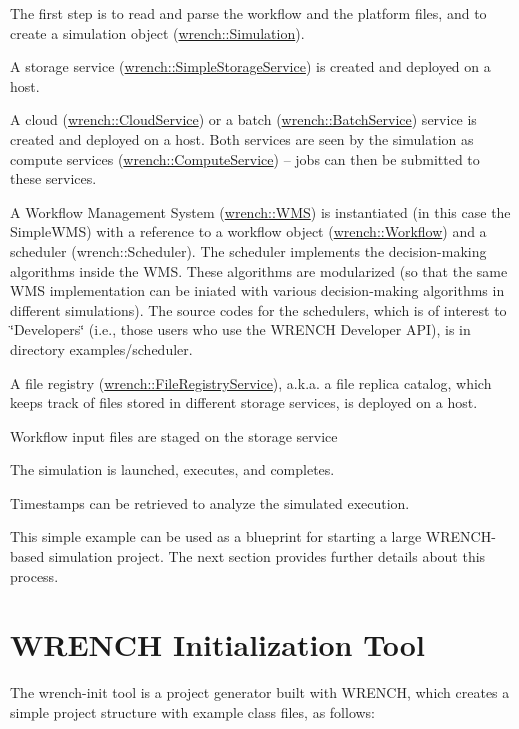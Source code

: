 \begin{DoxyItemize}
\item The first step is to read and parse the workflow and the platform files, and to create a simulation object ({\ttfamily \hyperlink{classwrench_1_1_simulation}{wrench\+::\+Simulation}}).
\item A storage service ({\ttfamily \hyperlink{classwrench_1_1_simple_storage_service}{wrench\+::\+Simple\+Storage\+Service}}) is created and deployed on a host.
\item A cloud ({\ttfamily \hyperlink{classwrench_1_1_cloud_service}{wrench\+::\+Cloud\+Service}}) or a batch ({\ttfamily \hyperlink{classwrench_1_1_batch_service}{wrench\+::\+Batch\+Service}}) service is created and deployed on a host. Both services are seen by the simulation as compute services ({\ttfamily \hyperlink{classwrench_1_1_compute_service}{wrench\+::\+Compute\+Service}}) – jobs can then be submitted to these services.
\item A Workflow Management System ({\ttfamily \hyperlink{classwrench_1_1_w_m_s}{wrench\+::\+W\+MS}}) is instantiated (in this case the {\ttfamily Simple\+W\+MS}) with a reference to a workflow object ({\ttfamily \hyperlink{classwrench_1_1_workflow}{wrench\+::\+Workflow}}) and a scheduler ({\ttfamily wrench\+::\+Scheduler}). The scheduler implements the decision-\/making algorithms inside the W\+MS. These algorithms are modularized (so that the same W\+MS implementation can be iniated with various decision-\/making algorithms in different simulations). The source codes for the schedulers, which is of interest to \char`\"{}\+Developers\char`\"{} (i.\+e., those users who use the W\+R\+E\+N\+CH Developer A\+PI), is in directory {\ttfamily examples/scheduler}.
\item A file registry ({\ttfamily \hyperlink{classwrench_1_1_file_registry_service}{wrench\+::\+File\+Registry\+Service}}), a.\+k.\+a. a file replica catalog, which keeps track of files stored in different storage services, is deployed on a host.
\item Workflow input files are staged on the storage service
\item The simulation is launched, executes, and completes.
\item Timestamps can be retrieved to analyze the simulated execution.
\end{DoxyItemize}

This simple example can be used as a blueprint for starting a large W\+R\+E\+N\+C\+H-\/based simulation project. The next section provides further details about this process.\hypertarget{getting-started_getting-started-wrench-init}{}\section{W\+R\+E\+N\+C\+H Initialization Tool}\label{getting-started_getting-started-wrench-init}
The {\ttfamily wrench-\/init} tool is a project generator built with W\+R\+E\+N\+CH, which creates a simple project structure with example class files, as follows\+:


